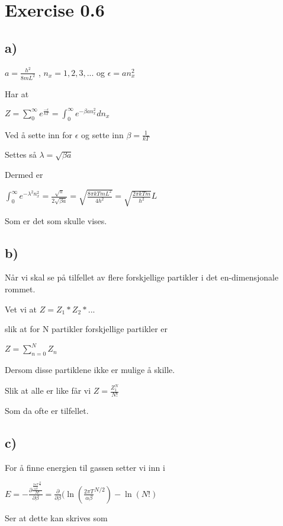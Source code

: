 \documentclass[12pt]{article}
\begin{document}
\section{Exercise 0.6}
\subsection*{a)}

$a = \frac{h^2}{8mL^2}$ ,  $n_x = 1, 2, 3, ...$ og $\epsilon = an_x^2$

Har at 

$ Z = \sum_0^\infty e^{\frac{-\epsilon}{kT}} = \int_0^\infty e^{-\beta a n_x^2} dn_x$ 

Ved å sette inn for $\epsilon$ og sette inn $ \beta = \frac{1}{kT}$

Settes så $\lambda = \sqrt{\beta a}$ 

Dermed er 

$\int_0^\infty e^{-\lambda^2n_x^2} = \frac{\sqrt{\pi}}{2\sqrt{\beta a}} = \sqrt{\frac{8\pi kTmL^2}{4h^2}} = \sqrt{\frac{2\pi kTm}{h^2}}L$

Som er det som skulle vises.

\subsection*{b)} 


Når vi skal se på tilfellet av flere forskjellige partikler i det en-dimensjonale rommet. 

Vet vi at $Z = Z_1*Z_2*...$

slik at for N partikler forskjellige partikler er 

$Z = \sum_{n= 0}^N Z_n$


Dersom disse partiklene ikke er mulige å skille. 

Slik at alle er like får vi $Z = \frac{Z_1^N}{N!}$

Som da ofte er tilfellet.

\subsection*{c)}

 For å finne energien til gassen setter vi inn i 
 
 $E =-\frac{\partial\frac{ \frac{2\pi T}{\alpha \beta}^{\frac{N}{2}}}{N!}}{\partial \beta} = \frac{\partial}{\partial \beta} (\ln(\frac{2\pi T}{\alpha \beta}^{N/2})- \ln(N!)$
 
 Ser at dette kan skrives som 
 
\end{document}
